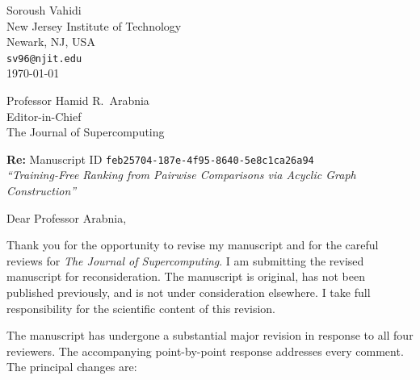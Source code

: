 \documentclass[11pt]{article}
\begin{document}
\begin{flushright}
Soroush Vahidi\\
New Jersey Institute of Technology\\
Newark, NJ, USA\\
\texttt{sv96@njit.edu}\\[0.35em]
\today
\end{flushright}

\noindent Professor Hamid R.\ Arabnia\\
Editor-in-Chief\\
The Journal of Supercomputing

\vspace{0.4em}
\noindent\textbf{Re:} Manuscript ID \texttt{feb25704-187e-4f95-8640-5e8c1ca26a94}\\
\textit{``Training-Free Ranking from Pairwise Comparisons via Acyclic Graph Construction''}

\vspace{0.4em}
Dear Professor Arabnia,

Thank you for the opportunity to revise my manuscript and for the careful reviews for \textit{The Journal of Supercomputing}.
I am submitting the revised manuscript for reconsideration.
The manuscript is original, has not been published previously, and is not under consideration elsewhere.
I take full responsibility for the scientific content of this revision.

The manuscript has undergone a substantial major revision in response to all four reviewers.
The accompanying point-by-point response addresses every comment.
The principal changes are:
\end{document}
